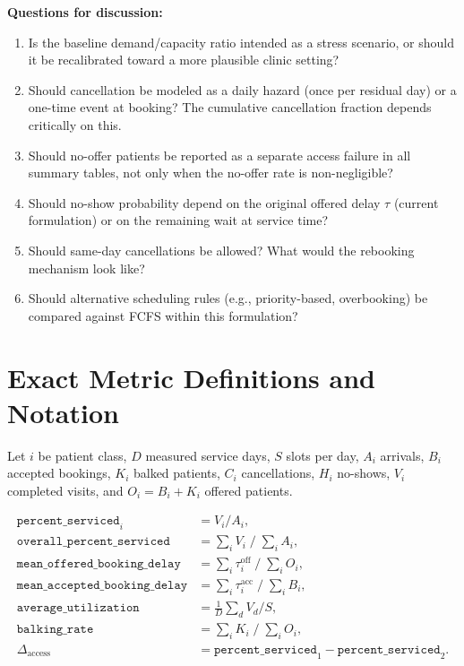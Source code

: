 \documentclass[11pt]{article}
\begin{document}
\bigskip
\noindent\textbf{Questions for discussion:}
\begin{enumerate}[leftmargin=1.5em, itemsep=4pt]
\item Is the baseline demand/capacity ratio intended as a stress scenario,
or should it be recalibrated toward a more plausible clinic setting?
\item Should cancellation be modeled as a daily hazard (once per residual
day) or a one-time event at booking? The cumulative cancellation fraction
depends critically on this.
\item Should no-offer patients be reported as a separate access failure
in all summary tables, not only when the no-offer rate is non-negligible?
\item Should no-show probability depend on the original offered delay
$\tau$ (current formulation) or on the remaining wait at service time?
\item Should same-day cancellations be allowed? What would the rebooking
mechanism look like?
\item Should alternative scheduling rules (e.g., priority-based,
overbooking) be compared against FCFS within this formulation?
\end{enumerate}

\appendix

\section{Exact Metric Definitions and Notation}
\label{app:defs}

Let $i$ be patient class, $D$ measured service days, $S$ slots per day,
$A_i$ arrivals, $B_i$ accepted bookings, $K_i$ balked patients, $C_i$
cancellations, $H_i$ no-shows, $V_i$ completed visits, and
$O_i = B_i + K_i$ offered patients.

\begin{align*}
\texttt{percent\_serviced}_i &= V_i / A_i, \\
\texttt{overall\_percent\_serviced} &= \textstyle\sum_i V_i \;/\; \textstyle\sum_i A_i, \\
\texttt{mean\_offered\_booking\_delay} &= \textstyle\sum_i \tau^{\text{off}}_i \;/\; \textstyle\sum_i O_i, \\
\texttt{mean\_accepted\_booking\_delay} &= \textstyle\sum_i \tau^{\text{acc}}_i \;/\; \textstyle\sum_i B_i, \\
\texttt{average\_utilization} &= \tfrac{1}{D}\textstyle\sum_d V_d / S, \\
\texttt{balking\_rate} &= \textstyle\sum_i K_i \;/\; \textstyle\sum_i O_i, \\
\Delta_{\text{access}} &= \texttt{percent\_serviced}_1 - \texttt{percent\_serviced}_2.
\end{align*}
\end{document}
